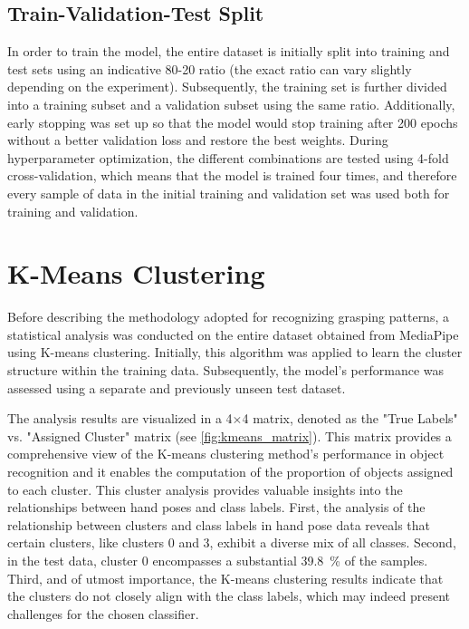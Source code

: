 \subsection{Train-Validation-Test Split}

In order to train the model, the entire dataset is initially split into training and test sets using an indicative 80-20 ratio (the exact ratio can vary slightly depending on the experiment). Subsequently, the training set is further divided into a training subset and a validation subset using the same ratio. Additionally, early stopping was set up so that the model would stop training after 200 epochs without a better validation loss and restore the best weights. During hyperparameter optimization, the different combinations are tested using 4-fold cross-validation, which means that the model is trained four times, and therefore every sample of data in the initial training and validation set was used both for training and validation.

\section{K-Means Clustering}
\label{section:kmeans_clustering}


Before describing the methodology adopted for recognizing grasping patterns, a statistical analysis was conducted on the entire dataset obtained from MediaPipe using K-means clustering. Initially, this algorithm was applied to learn the cluster structure within the training data. Subsequently, the model's performance was assessed using a separate and previously unseen test dataset.

The analysis results are visualized in a 4$\times$4 matrix, denoted as the "True Labels" vs. "Assigned Cluster" matrix (see \autoref{fig:kmeans_matrix}). This matrix provides a comprehensive view of the K-means clustering method's performance in object recognition and it enables the computation of the proportion of objects assigned to each cluster. This cluster analysis provides valuable insights into the relationships between hand poses and class labels. First, the analysis of the relationship between clusters and class labels in hand pose data reveals that certain clusters, like clusters 0 and 3, exhibit a diverse mix of all classes. Second, in the test data, cluster 0 encompasses a substantial \SI{39.8}{\percent} of the samples. Third, and of utmost importance, the K-means clustering results indicate that the clusters do not closely align with the class labels, which may indeed present challenges for the chosen classifier.

